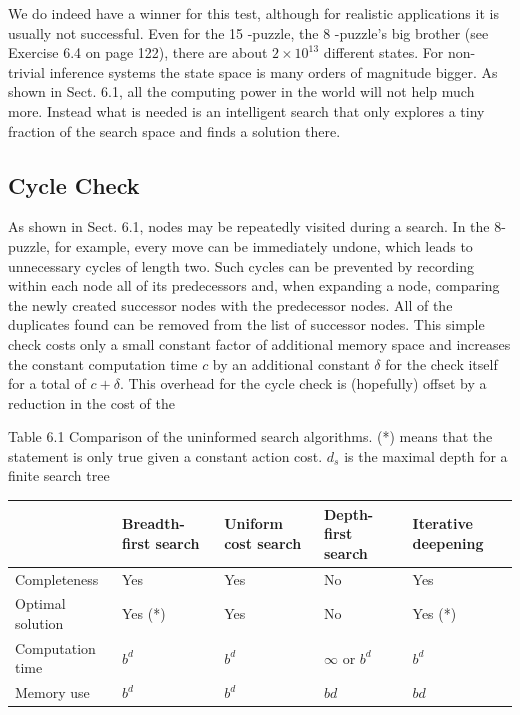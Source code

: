 \documentclass[10pt]{book}
\begin{document}
We do indeed have a winner for this test, although for realistic applications it is usually not successful. Even for the 15 -puzzle, the 8 -puzzle's big brother (see Exercise 6.4 on page 122), there are about $2 \times 10^{13}$ different states. For non-trivial inference systems the state space is many orders of magnitude bigger. As shown in Sect. 6.1, all the computing power in the world will not help much more. Instead what is needed is an intelligent search that only explores a tiny fraction of the search space and finds a solution there.

\subsection{Cycle Check}
As shown in Sect. 6.1, nodes may be repeatedly visited during a search. In the 8-puzzle, for example, every move can be immediately undone, which leads to unnecessary cycles of length two. Such cycles can be prevented by recording within each node all of its predecessors and, when expanding a node, comparing the newly created successor nodes with the predecessor nodes. All of the duplicates found can be removed from the list of successor nodes. This simple check costs only a small constant factor of additional memory space and increases the constant computation time $c$ by an additional constant $\delta$ for the check itself for a total of $c+\delta$. This overhead for the cycle check is (hopefully) offset by a reduction in the cost of the

Table 6.1 Comparison of the uninformed search algorithms. (*) means that the statement is only true given a constant action cost. $d_{s}$ is the maximal depth for a finite search tree

\begin{center}
\begin{tabular}{|l|l|l|l|l|}
\hline
 & Breadth-first search & Uniform cost search & Depth-first search & Iterative deepening \\
\hline
Completeness & Yes & Yes & No & Yes \\
\hline
Optimal solution & Yes (*) & Yes & No & Yes (*) \\
\hline
Computation time & $b^{d}$ & $b^{d}$ & $\infty$ or $b^{d}$ & $b^{d}$ \\
\hline
Memory use & $b^{d}$ & $b^{d}$ & $b d$ & $bd$ \\
\hline
\end{tabular}
\end{center}
\end{document}
